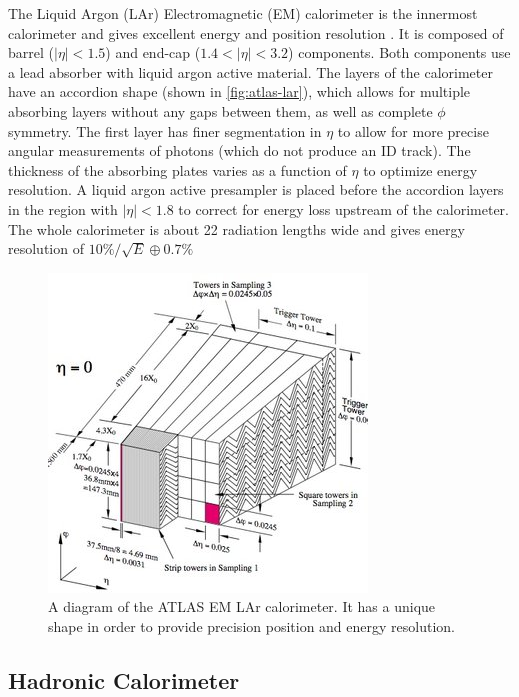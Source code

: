 The Liquid Argon (LAr) Electromagnetic (EM) calorimeter is the innermost calorimeter and gives excellent energy and position resolution \cite{calorimeters}. It is composed of barrel ($|\eta| < 1.5$) and end-cap ($1.4 < |\eta| < 3.2$) components. Both components use a lead absorber with liquid argon active material. The layers of the calorimeter have an accordion shape (shown in \autoref{fig:atlas-lar}), which allows for multiple absorbing layers without any gaps between them, as well as complete $\phi$ symmetry. The first layer has finer segmentation in $\eta$ to allow for more precise angular measurements of photons (which do not produce an \ac{ID} track). The thickness of the absorbing plates varies as a function of $\eta$ to optimize energy resolution. A liquid argon active presampler is placed before the accordion layers in the region with $|\eta| < 1.8$ to correct for energy loss upstream of the calorimeter. The whole calorimeter is about 22 radiation lengths wide and gives energy resolution of $10\%/\sqrt{E} \oplus 0.7\%$

\begin{figure}[!h]
\centering
\includegraphics[width=.6\textwidth]{figures/Detector/lar.jpg}
\caption{A diagram of the \ac{ATLAS} \ac{EM} \ac{LAr} calorimeter. It has a unique shape in order to provide precision position and energy resolution.}
\label{fig:atlas-lar}
\end{figure}


\subsection{Hadronic Calorimeter}


